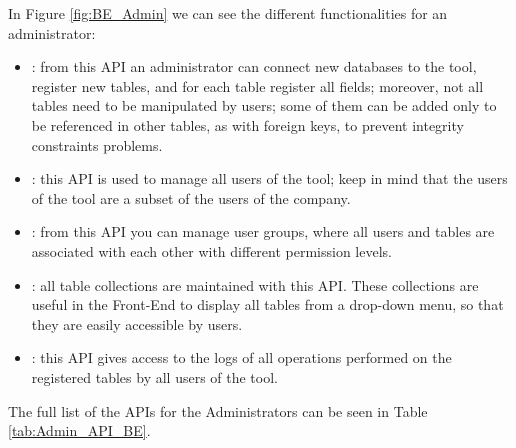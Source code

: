In Figure \ref{fig:BE_Admin} we can see the different functionalities for an administrator:
\begin{itemize}
    \item {}: from this API an administrator can connect new databases to the tool, register new tables, and for each table register all fields; moreover, not all tables need to be manipulated by users; some of them can be added only to be referenced in other tables, as with foreign keys, to prevent integrity constraints problems.
    \item {}: this API is used to manage all users of the tool; keep in mind that the users of the tool are a subset of the users of the company.
    \item {}: from this API you can manage user groups, where all users and tables are associated with each other with different permission levels.
    \item {}: all table collections are maintained with this API. These collections are useful in the Front-End to display all tables from a drop-down menu, so that they are easily accessible by users.
    \item {}: this API gives access to the logs of all operations performed on the registered tables by all users of the tool.
\end{itemize}

The full list of the APIs for the Administrators can be seen in Table \ref{tab:Admin_API_BE}.

